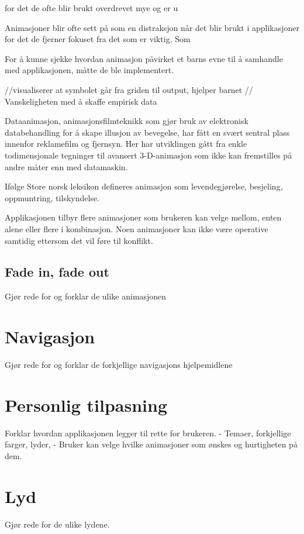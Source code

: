 \documentclass[phd,tocprelim]{cornell}
\begin{document}
for det de ofte blir brukt overdrevet mye og er u

Animasjoner blir ofte sett på som en distraksjon når det blir brukt i applikasjoner for det de fjerner fokuset fra det som er viktig. Som 


For å kunne sjekke hvordan animasjon påvirket et barns evne til å samhandle med applikasjonen, måtte de ble implementert.  

//visualiserer at symbolet går fra griden til output, hjelper barnet
// Vanskeligheten med å skaffe empirisk data


Dataanimasjon, animasjonsfilmteknikk som gjør bruk av elektronisk databehandling for å skape illusjon av bevegelse, har fått en svært sentral plass innenfor reklamefilm og fjernsyn. Her har utviklingen gått fra enkle todimensjonale tegninger til avansert 3-D-animasjon som ikke kan fremstilles på andre måter enn med datamaskin.

Ifølge Store norsk leksikon defineres animasjon som levendegjørelse, besjeling, oppmuntring, tilskyndelse. 


Applikasjonen tilbyr flere animasjoner som brukeren kan velge mellom, enten alene eller flere i kombinasjon. Noen animasjoner kan ikke være operative samtidig ettersom det vil føre til konflikt. 

\subsection{Fade in, fade out}

Gjør rede for og forklar de ulike animasjonen

\section{Navigasjon}
Gjør rede for og forklar de forkjellige navigasjons hjelpemidlene

\section{Personlig tilpasning}
Forklar hvordan applikasjonen legger til rette for brukeren.
    - Temaer, forkjellige farger, lyder, 
    - Bruker kan velge hvilke animasjoner som ønskes og hurtigheten på dem.
    
\section{Lyd}
    Gjør rede for de ulike lydene.
\end{document}

